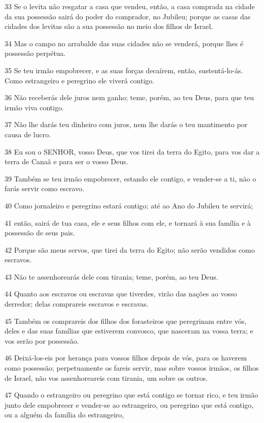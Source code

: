\par 33 Se o levita não resgatar a casa que vendeu, então, a casa comprada na cidade da sua possessão sairá do poder do comprador, no Jubileu; porque as casas das cidades dos levitas são a sua possessão no meio dos filhos de Israel.
\par 34 Mas o campo no arrabalde das suas cidades não se venderá, porque lhes é possessão perpétua.
\par 35 Se teu irmão empobrecer, e as suas forças decaírem, então, sustentá-lo-ás. Como estrangeiro e peregrino ele viverá contigo.
\par 36 Não receberás dele juros nem ganho; teme, porém, ao teu Deus, para que teu irmão viva contigo.
\par 37 Não lhe darás teu dinheiro com juros, nem lhe darás o teu mantimento por causa de lucro.
\par 38 Eu sou o SENHOR, vosso Deus, que vos tirei da terra do Egito, para vos dar a terra de Canaã e para ser o vosso Deus.
\par 39 Também se teu irmão empobrecer, estando ele contigo, e vender-se a ti, não o farás servir como escravo.
\par 40 Como jornaleiro e peregrino estará contigo; até ao Ano do Jubileu te servirá;
\par 41 então, sairá de tua casa, ele e seus filhos com ele, e tornará à sua família e à possessão de seus pais.
\par 42 Porque são meus servos, que tirei da terra do Egito; não serão vendidos como escravos.
\par 43 Não te assenhorearás dele com tirania; teme, porém, ao teu Deus.
\par 44 Quanto aos escravos ou escravas que tiverdes, virão das nações ao vosso derredor; delas comprareis escravos e escravas.
\par 45 Também os comprareis dos filhos dos forasteiros que peregrinam entre vós, deles e das suas famílias que estiverem convosco, que nasceram na vossa terra; e vos serão por possessão.
\par 46 Deixá-los-eis por herança para vossos filhos depois de vós, para os haverem como possessão; perpetuamente os fareis servir, mas sobre vossos irmãos, os filhos de Israel, não vos assenhoreareis com tirania, um sobre os outros.
\par 47 Quando o estrangeiro ou peregrino que está contigo se tornar rico, e teu irmão junto dele empobrecer e vender-se ao estrangeiro, ou peregrino que está contigo, ou a alguém da família do estrangeiro,
